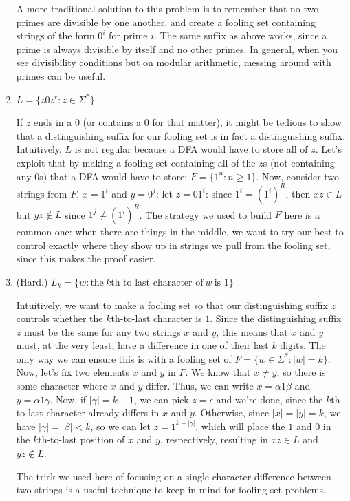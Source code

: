 \documentclass[fleqn]{article}
\begin{document}
\begin{enumerate}
\begin{answer}
        A more traditional solution to this problem is to remember that no two primes are divisible by one another, and create a fooling set containing strings of the form $0^i$ for prime $i$. The same suffix as above works, since a prime is always divisible by itself and no other primes. In general, when you see divisibility conditions but on modular arithmetic, messing around with primes can be useful.
    \end{answer}
    \item $L = \{z0z^r : z \in \Sigma^*\}$
    \begin{answer}
        If $z$ ends in a $0$ (or contains a $0$ for that matter), it might be tedious to show that a distinguishing suffix for our fooling set is in fact a distinguishing suffix. Intuitively, $L$ is not regular because a DFA would have to store all of $z$. Let's exploit that by making a fooling set containing all of the $z$s (not containing any $0$s) that a DFA would have to store: $\boxed{F = \{1^n : n \geq 1\}}$. Now, consider two strings from $F$, $x = 1^i$ and $y = 0^j$:  let $z = 01^i$: since $1^i = (1^i)^R$, then $xz \in L$ but $yz \notin L$ since $1^j \neq (1^i)^R$. The strategy we used to build $F$ here is a common one: when there are things in the middle, we want to try our best to control exactly where they show up in strings we pull from the fooling set, since this makes the proof easier.
    \end{answer}
    \item (Hard.) $L_k = \{w : \text{the}~ k\text{th to last character of}~w~\text{is } 1\}$
    \begin{answer}
        Intuitively, we want to make a fooling set so that our distinguishing suffix $z$ controls whether the $k$th-to-last character is $1$. Since the distinguishing suffix $z$ must be the same for any two strings $x$ and $y$, this means that $x$ and $y$ must, at the very least, have a difference in one of their last $k$ digits. The only way we can ensure this is with a fooling set of $\boxed{F = \{w \in \Sigma^* : |w| = k\}}$. Now, let's fix two elements $x$ and $y$ in $F$. We know that $x \neq y$, so there is some character where $x$ and $y$ differ. Thus, we can write $x = \alpha 1 \beta$ and $y = \alpha 1 \gamma$. Now, if $|\gamma| = k-1$, we can pick $z = \epsilon$ and we're done, since the $k$th-to-last character already differs in $x$ and $y$. Otherwise, since $|x| = |y| = k$, we have $|\gamma| = |\beta| < k$, so we can let $z = 1^{k - |\gamma|}$, which will place the $1$ and $0$ in the $k$th-to-last position of $x$ and $y$, respectively, resulting in $xz \in L$ and $yz \notin L$.

        The trick we used here of focusing on a single character difference between two strings is a useful technique to keep in mind for fooling set problems.
    \end{answer}
\end{enumerate}
\end{document}

